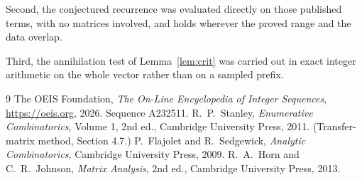 \documentclass[11pt,a4paper]{article}
\theoremstyle{plain}
\theoremstyle{definition}
\begin{document}
Second, the conjectured recurrence was evaluated directly on those published terms, with no
matrices involved, and holds wherever the proved range and the data overlap.

Third, the annihilation test of Lemma~\ref{lem:crit} was carried out in exact integer
arithmetic on the whole vector rather than on a sampled prefix.

\begin{thebibliography}{9}
 The OEIS Foundation, \emph{The On-Line Encyclopedia of Integer
Sequences}, \url{https://oeis.org}, 2026. Sequence A232511.
 R.~P.~Stanley, \emph{Enumerative Combinatorics}, Volume 1, 2nd ed.,
Cambridge University Press, 2011. (Transfer-matrix method, Section 4.7.)
 P.~Flajolet and R.~Sedgewick, \emph{Analytic Combinatorics}, Cambridge
University Press, 2009.
 R.~A.~Horn and C.~R.~Johnson, \emph{Matrix Analysis}, 2nd ed., Cambridge
University Press, 2013.
\end{thebibliography}
\end{document}
